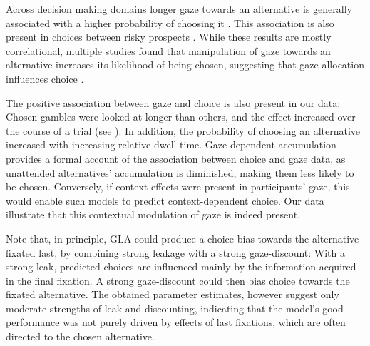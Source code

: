 \documentclass[11pt, a4paper]{article}
\begin{document}
Across decision making domains longer gaze towards an alternative is generally associated with a higher probability of choosing it \parencite{armel2008BiasingSimpleChoices,ashby2016FindingRightFit,cavanagh2014EyeTrackingPupillometry,folke2016ExplicitRepresentationConfidence,gluth2020ValuebasedAttentionNot,krajbich2010VisualFixationsComputation,krajbich2011MultialternativeDriftdiffusionModel,shimojo2003GazeBiasBoth,smith2018AttentionChoiceDomains,tavares2017AttentionalDriftDiffusion,towal2013SimultaneousModelingVisual,vaidya2015TestingNecessaryRegional}. This association is also present in choices between risky prospects \parencite{fiedler2012DynamicsDecisionMaking,glickman2019FormationPreferenceRisky,smith2018AttentionChoiceDomains,stewart2016EyeMovementsRisky}. While these results are mostly correlational, multiple studies found that manipulation of gaze towards an alternative increases its likelihood of being chosen, suggesting that gaze allocation influences choice \parencite{armel2008BiasingSimpleChoices,liu2020ExploitingDynamicsEye,parnamets2015BiasingMoralDecisions,shimojo2003GazeBiasBoth,sui2020TimingGazecontingentDecision,tavares2017AttentionalDriftDiffusion}.

The positive association between gaze and choice is also present in our data: Chosen gambles were looked at longer than others, and the effect increased over the course of a trial (see ). In addition, the probability of choosing an alternative increased with increasing relative dwell time. Gaze-dependent accumulation provides a formal account of the association between choice and gaze data, as unattended alternatives’ accumulation is diminished, making them less likely to be chosen. Conversely, if context effects were present in participants’ gaze, this would enable such models to predict context-dependent choice. Our data illustrate that this contextual modulation of gaze is indeed present.

Note that, in principle, GLA could produce a choice bias towards the alternative fixated last, by combining strong leakage with a strong gaze-discount: With a strong leak, predicted choices are influenced mainly by the information acquired in the final fixation. A strong gaze-discount could then bias choice towards the fixated alternative. The obtained parameter estimates, however suggest only moderate strengths of leak and discounting, indicating that the model’s good performance was not purely driven by effects of last fixations, which are often directed to the chosen alternative.  
\end{document}
